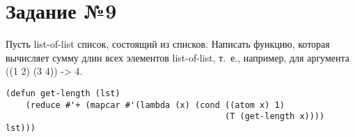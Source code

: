 \section{Задание №9}

Пусть list-of-list список, состоящий из списков. Написать функцию, которая
вычисляет сумму длин всех элементов list-of-list, т.~е., например, для
аргумента ((1 2) (3 4)) -> 4.

\vspace{4mm}
\begin{minipage}{0.92\linewidth}
\begin{lstlisting}
(defun get-length (lst)
    (reduce #'+ (mapcar #'(lambda (x) (cond ((atom x) 1)
                                            (T (get-length x)))) lst)))
\end{lstlisting}
\end{minipage}

